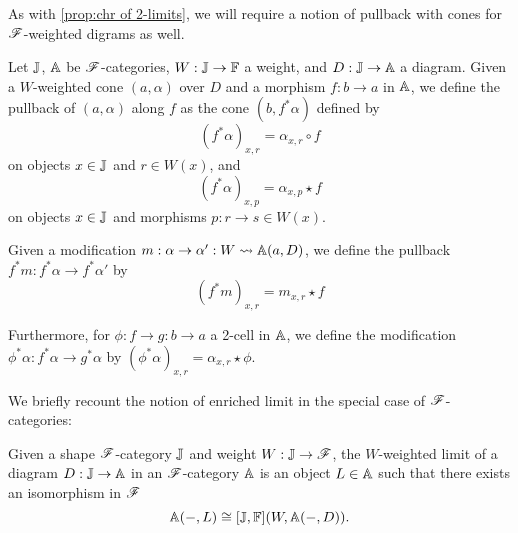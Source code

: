 \documentclass[../thesis.tex]{subfiles}
\begin{document}
As with \cref{prop:chr of 2-limits}, we will require a notion of pullback with cones for ${\mathscr{F}}$-weighted
digrams as well.
\begin{definition}
  Let ${\mathbb{J}}$, ${\mathbb{A}}$ be ${\mathscr{F}}$-categories, $W : {\mathbb{J}} \to {\mathbb{F}}$ a weight, and $D : {\mathbb{J}} \to {\mathbb{A}}$ a diagram.
  Given a $W$-weighted cone $(a,\alpha)$ over $D$ and a morphism $f : b \to a$ in ${\mathbb{A}}$, we define
  the pullback of $(a,\alpha)$ along $f$ as the cone $(b,f^*\alpha)$ defined by
  \[(f^*\alpha)_{x,r} = \alpha_{x,r} \circ f\]
  on objects $x \in {\mathbb{J}}$ and $r \in W(x)$, and
  \[(f^*\alpha)_{x,p} = \alpha_{x,p} \star f\]
  on objects $x \in {\mathbb{J}}$ and morphisms $p : r \to s \in W(x)$.

  Given a modification $m : \alpha \to \alpha' : W \rightsquigarrow {\mathbb{A}}(a,D)$, we define the pullback $f^*m : f^*\alpha
  \to f^*\alpha'$ by
  \[(f^*m)_{x,r} = m_{x,r} \star f\]

  Furthermore, for $\phi : f \to g : b \to a$ a 2-cell in ${\mathbb{A}}$, we define the modification $\phi^*\alpha :
  f^*\alpha \to g^*\alpha$ by \((\phi^*\alpha)_{x,r} = \alpha_{x,r} \star \phi\).
\end{definition}

We briefly recount the notion of enriched limit in the special case of ${\mathscr{F}}$-categories:
\begin{definition}
  Given a shape ${\mathscr{F}}$-category ${\mathbb{J}}$ and weight $W : {\mathbb{J}} \to {\mathscr{F}}$, the $W$-weighted limit of a diagram
  $D : {\mathbb{J}} \to {\mathbb{A}}$ in an ${\mathscr{F}}$-category ${\mathbb{A}}$ is an object $L \in {\mathbb{A}}$ such that there exists an
  isomorphism in ${\mathscr{F}}$
  \[{\mathbb{A}}(-,L) \cong [{\mathbb{J}},{\mathbb{F}}](W,{\mathbb{A}}(-,D)).\]
\end{definition}
\end{document}
